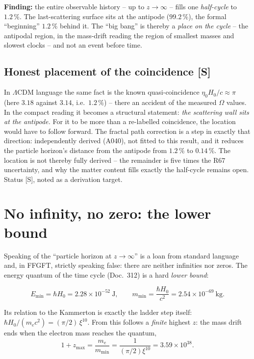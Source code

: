 \documentclass[11pt]{report}
\begin{document}
\textbf{Finding:} the entire observable history -- up to
$z \to \infty$ -- fills one \emph{half-cycle} to $1.2\,\%$. The
last-scattering surface sits at the antipode ($99.2\,\%$), the
formal \enquote{beginning} $1.2\,\%$ behind it. The
\enquote{big bang} is thereby a \emph{place on the cycle} -- the
antipodal region, in the mass-drift reading the region of smallest
masses and slowest clocks -- and not an event before time.

\section{Honest placement of the coincidence [S]}

In $\Lambda$CDM language the same fact is the known
quasi-coincidence $\eta_0 H_0/c \approx \pi$ (here $3.18$ against
$3.14$, i.e.\ $1.2\,\%$) -- there an accident of the measured
$\Omega$ values. In the compact reading it becomes a structural
statement: \emph{the scattering wall sits at the antipode.} For it
to be more than a re-labelled coincidence, the location would have
to follow forward. The fractal path correction is a step in
exactly that direction: independently derived (A040), not fitted
to this result, and it reduces the particle horizon's distance
from the antipode from $1.2\,\%$ to $0.14\,\%$. The location is
not thereby fully derived -- the remainder is five times the R67
uncertainty, and why the matter content fills exactly the
half-cycle remains open. Status [S], noted as a derivation
target.

\chapter{No infinity, no zero: the lower bound}

Speaking of the \enquote{particle horizon at $z\to\infty$} is a
loan from standard language and, in FFGFT, strictly speaking
false: there are neither infinities nor zeros. The energy quantum
of the time cycle (Doc.~312) is a hard \emph{lower bound}:

\begin{equation}
  E_\text{min} = \hbar H_0 = 2.28\times10^{-52}~\text{J},
  \qquad
  m_\text{min} = \frac{\hbar H_0}{c^2}
  = 2.54\times10^{-69}~\text{kg}.
\end{equation}

Its relation to the Kammerton is exactly the ladder step itself:
$\hbar H_0/(m_ec^2) = (\pi/2)\,\xi^{10}$. From this follows a
\emph{finite} highest $z$: the mass drift ends when the electron
mass reaches the quantum,
\begin{equation}
  1+z_\text{max} = \frac{m_e}{m_\text{min}}
  = \frac{1}{(\pi/2)\xi^{10}} = 3.59\times10^{38}.
\end{equation}
\end{document}
